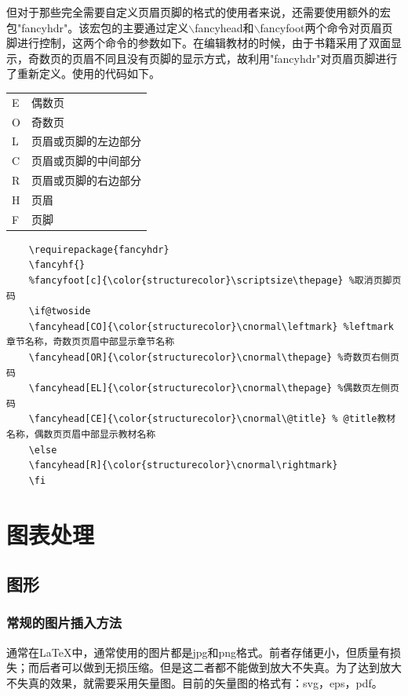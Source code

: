 \documentclass[12pt]{book}
\begin{document}
但对于那些完全需要自定义页眉页脚的格式的使用者来说，还需要使用额外的宏包"fancyhdr"。该宏包的主要通过定义$\backslash$fancyhead和$\backslash$fancyfoot两个命令对页眉页脚进行控制，这两个命令的参数如下。在编辑教材的时候，由于书籍采用了双面显示，奇数页的页眉不同且没有页脚的显示方式，故利用"fancyhdr"对页眉页脚进行了重新定义。使用的代码如下。
\begin{table}[h]
    \centering
    \begin{tabular}{ll}
        E &     偶数页\\
        O &     奇数页 \\
        L &     页眉或页脚的左边部分\\
        C &     页眉或页脚的中间部分\\
        R &     页眉或页脚的右边部分\\
        H &     页眉\\
        F &     页脚
    \end{tabular}
\end{table}
\begin{verbatim}
    \requirepackage{fancyhdr}
    \fancyhf{} 
    %fancyfoot[c]{\color{structurecolor}\scriptsize\thepage} %取消页脚页码
    \if@twoside
    \fancyhead[CO]{\color{structurecolor}\cnormal\leftmark} %leftmark章节名称，奇数页页眉中部显示章节名称
    \fancyhead[OR]{\color{structurecolor}\cnormal\thepage} %奇数页右侧页码
    \fancyhead[EL]{\color{structurecolor}\cnormal\thepage} %偶数页左侧页码
    \fancyhead[CE]{\color{structurecolor}\cnormal\@title} % @title教材名称，偶数页页眉中部显示教材名称
    \else
    \fancyhead[R]{\color{structurecolor}\cnormal\rightmark}
    \fi
\end{verbatim}



\chapter{图表处理}

\section{图形}




\subsection{常规的图片插入方法}

通常在\LaTeX{}中，通常使用的图片都是jpg和png格式。前者存储更小，但质量有损失；而后者可以做到无损压缩。但是这二者都不能做到放大不失真。为了达到放大不失真的效果，就需要采用矢量图。目前的矢量图的格式有：svg，eps，pdf。
\end{document}
